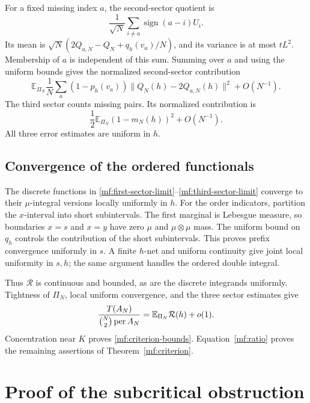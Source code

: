 For a fixed missing index \(a\), the second-sector quotient is
\[
 \frac1{\sqrt N}\sum_{i\ne a}\operatorname{sign}(a-i)U_i.
\]
Its mean is
\(\sqrt N(2Q_{a,N}-Q_N+q_h(v_a)/N)\), and its variance is at most
\(tL^2\). Membership of \(a\) is independent of this sum. Summing over
\(a\) and using the uniform bounds gives the normalized second-sector
contribution
\begin{equation}\label{mf:second-sector-limit}
 \mathbb E_{\Pi_N}\frac1N\sum_a
 (1-p_h(v_a))\|Q_N(h)-2Q_{a,N}(h)\|^2+O(N^{-1}).
\end{equation}
The third sector counts missing pairs. Its normalized contribution is
\begin{equation}\label{mf:third-sector-limit}
 \frac12\mathbb E_{\Pi_N}(1-m_N(h))^2+O(N^{-1}).
\end{equation}
All three error estimates are uniform in \(h\).

\subsection{Convergence of the ordered functionals}

The discrete functions in
\eqref{mf:first-sector-limit}--\eqref{mf:third-sector-limit} converge to
their \(\mu\)-integral versions locally uniformly in \(h\).
For the order indicators, partition the \(x\)-interval into short
subintervals. The first marginal is Lebesgue measure, so boundaries
\(x=s\) and \(x=y\) have zero \(\mu\) and \(\mu\otimes\mu\) mass.
The uniform bound on \(q_h\) controls the contribution of the short
subintervals. This proves prefix convergence uniformly in \(s\).
A finite \(h\)-net and uniform continuity give joint local uniformity
in \(s,h\); the same argument handles the ordered double integral.

Thus \(\mathcal R\) is continuous and bounded, as are the discrete
integrands uniformly. Tightness of \(\Pi_N\), local uniform convergence,
and the three sector estimates give
\begin{equation}\label{mf:score-integral}
 \frac{T(A_N)}{\binom N2\operatorname{per} A_N}
       =\mathbb E_{\Pi_N}\mathcal R(h)+o(1).
\end{equation}
Concentration near \(K\) proves
\eqref{mf:criterion-bounds}. Equation~\eqref{mf:ratio} proves the
remaining assertions of Theorem~\ref{mf:criterion}.

\section{Proof of the subcritical obstruction}\label{mf:subcritical-proof}

